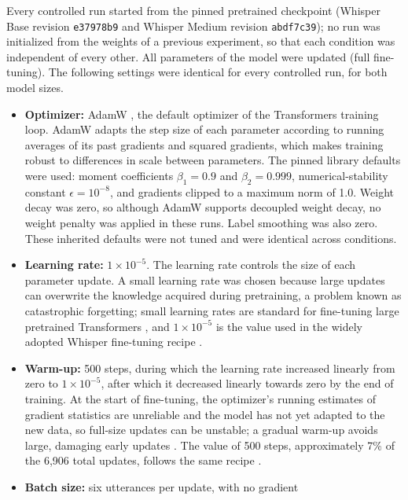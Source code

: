 Every controlled run started from the pinned pretrained checkpoint (Whisper Base
revision \texttt{e37978b9} and Whisper Medium revision \texttt{abdf7c39}); no run
was initialized from the weights of a previous experiment, so that each condition
was independent of every other. All parameters of the model were updated
(full fine-tuning). The following settings were identical for every controlled
run, for both model sizes.

\begin{itemize}
    \item \textbf{Optimizer:} AdamW \citep{Loshchilov2019}, the default optimizer
    of the Transformers training loop. AdamW adapts the step size of each
    parameter according to running averages of its past gradients and squared
    gradients, which makes training robust to differences in scale between
    parameters. The pinned library defaults were used: moment coefficients
    $\beta_1 = 0.9$ and $\beta_2 = 0.999$, numerical-stability constant
    $\epsilon = 10^{-8}$, and gradients clipped to a maximum norm of 1.0. Weight
    decay was zero, so although AdamW supports decoupled weight decay, no weight
    penalty was applied in these runs. Label smoothing was also zero. These
    inherited defaults were not tuned and were identical across conditions.
    \item \textbf{Learning rate:} $1 \times 10^{-5}$. The learning rate controls
    the size of each parameter update. A small learning rate was chosen because
    large updates can overwrite the knowledge acquired during pretraining, a
    problem known as catastrophic forgetting; small learning rates are standard
    for fine-tuning large pretrained Transformers \citep{Mosbach2021}, and
    $1 \times 10^{-5}$ is the value used in the widely adopted Whisper fine-tuning
    recipe \citep{Gandhi2022}.
    \item \textbf{Warm-up:} 500 steps, during which the learning rate increased
    linearly from zero to $1 \times 10^{-5}$, after which it decreased linearly
    towards zero by the end of training. At the start of fine-tuning, the
    optimizer's running estimates of gradient statistics are unreliable and the
    model has not yet adapted to the new data, so full-size updates can be
    unstable; a gradual warm-up avoids large, damaging early updates
    \citep{Goyal2017, Mosbach2021}. The value of 500 steps, approximately 7\% of
    the 6,906 total updates, follows the same recipe \citep{Gandhi2022}.
    \item \textbf{Batch size:} six utterances per update, with no gradient

\end{itemize}
